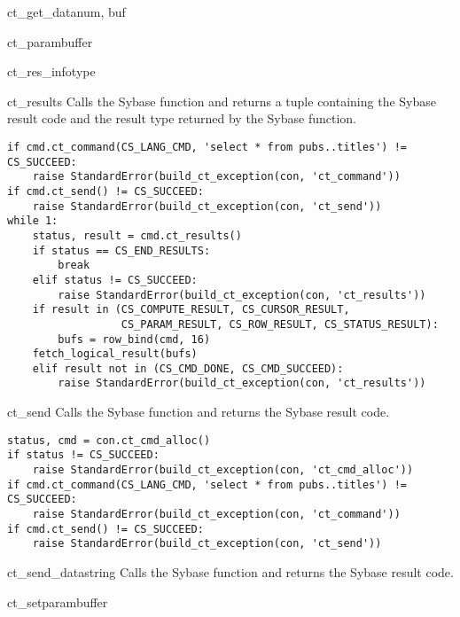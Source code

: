 \begin{methoddesc}[CS_COMMAND]{ct_get_data}{num, buf}
\end{methoddesc}

\begin{methoddesc}[CS_COMMAND]{ct_param}{buffer}
\end{methoddesc}

\begin{methoddesc}[CS_COMMAND]{ct_res_info}{type}
\end{methoddesc}

\begin{methoddesc}[CS_COMMAND]{ct_results}{}
Calls the Sybase  function and returns a tuple
containing the Sybase result code and the result type returned by the
Sybase function.

\begin{verbatim}
if cmd.ct_command(CS_LANG_CMD, 'select * from pubs..titles') != CS_SUCCEED:
    raise StandardError(build_ct_exception(con, 'ct_command'))
if cmd.ct_send() != CS_SUCCEED:
    raise StandardError(build_ct_exception(con, 'ct_send'))
while 1:
    status, result = cmd.ct_results()
    if status == CS_END_RESULTS:
        break
    elif status != CS_SUCCEED:
        raise StandardError(build_ct_exception(con, 'ct_results'))
    if result in (CS_COMPUTE_RESULT, CS_CURSOR_RESULT,
                  CS_PARAM_RESULT, CS_ROW_RESULT, CS_STATUS_RESULT):
        bufs = row_bind(cmd, 16)
	fetch_logical_result(bufs)
    elif result not in (CS_CMD_DONE, CS_CMD_SUCCEED):
        raise StandardError(build_ct_exception(con, 'ct_results'))
\end{verbatim}
\end{methoddesc}

\begin{methoddesc}[CS_COMMAND]{ct_send}{}
Calls the Sybase  function and returns the Sybase
result code.

\begin{verbatim}
status, cmd = con.ct_cmd_alloc()
if status != CS_SUCCEED:
    raise StandardError(build_ct_exception(con, 'ct_cmd_alloc'))
if cmd.ct_command(CS_LANG_CMD, 'select * from pubs..titles') != CS_SUCCEED:
    raise StandardError(build_ct_exception(con, 'ct_command'))
if cmd.ct_send() != CS_SUCCEED:
    raise StandardError(build_ct_exception(con, 'ct_send'))
\end{verbatim}
\end{methoddesc}

\begin{methoddesc}[CS_COMMAND]{ct_send_data}{string}
Calls the Sybase  function and returns the
Sybase result code.
\end{methoddesc}

\begin{methoddesc}[CS_COMMAND]{ct_setparam}{buffer}
\end{methoddesc}
